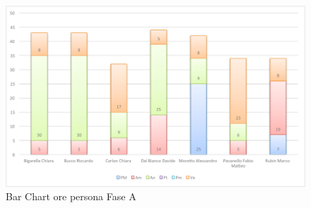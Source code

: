 				\begin{figure}[H]\centering
					\includegraphics[width=\textwidth]{PianoDiProgetto/Pics/ChartOreFaseA.pdf}
					\caption{Bar Chart ore persona Fase A}
				\end{figure}
